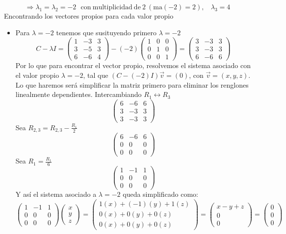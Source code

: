 \begin{itemize}
    $$ \Longrightarrow \lambda_1=\lambda_2 =-2~~\mathrm{\:con\:multiplicidad\:de\:}2~(\text{ma}(-2)=2),~~~\:\lambda_3 =4$$
    Encontrando los vectores propios para cada valor propio
    \begin{itemize}
        \item Para $\lambda=-2$ tenemos que susituyendo primero $\lambda=-2$
    $$C-\lambda I=\begin{pmatrix}1&-3&3\\ 3&-5&3\\ 6&-6&4\end{pmatrix}-\left(-2\right)\begin{pmatrix}1&0&0\\ 0&1&0\\ 0&0&1\end{pmatrix}=\begin{pmatrix}3&-3&3\\ 3&-3&3\\ 6&-6&6\end{pmatrix}$$
    Por lo que para encontrar el vector propio, resolvemos el sistema asociado con el valor propio $\lambda=-2$, tal que $(C-(-2)I)\vec{v}=(0)$, con $\vec{v}=(x,y,z)$.\\
    Lo que haremos ser\'a simplificar la matriz primero para eliminar los renglones linealmente dependientes.
    Intercambiando $R_1 \leftrightarrow R_3$
    $$\begin{pmatrix}6&-6&6\\ 3&-3&3\\ 3&-3&3\end{pmatrix}$$
    Sea $R_{2,3}=R_{2,3}-\frac{R_1}{2}$
    $$\begin{pmatrix}6&-6&6\\ 0&0&0\\ 0&0&0\end{pmatrix}$$
    Sea $R_1=\frac{R_1}{6}$
    $$\begin{pmatrix}1&-1&1\\ 0&0&0\\ 0&0&0\end{pmatrix}$$
    Y as\'i el sistema asociado a $\lambda=-2$ queda simplificado como:
    $$\begin{pmatrix}1&-1&1\\ 0&0&0\\ 0&0&0\end{pmatrix}\begin{pmatrix}x\\ y\\ z\end{pmatrix}=\begin{pmatrix}1(x)+(-1)(y)+1(z)\\ 0(x)+0(y)+0(z)\\ 0(x)+0(y)+0(z)\end{pmatrix}=\begin{pmatrix}x-y+z\\ 0\\ 0\end{pmatrix}=\begin{pmatrix}0\\ 0\\ 0\end{pmatrix}$$

\end{itemize}
\end{itemize}
